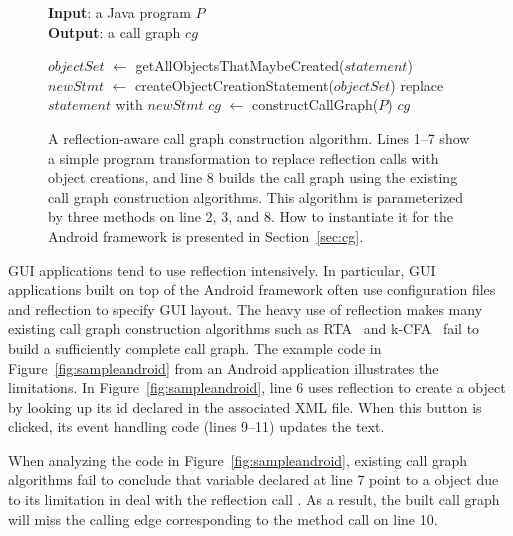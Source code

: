 \begin{figure}[t]
\textbf{Input}: a Java program $\mathit{P}$\\
\textbf{Output}: a call graph $\mathit{cg}$\\
\vspace{-5mm}
\begin{algorithmic}[1]
\STATE $\mathit{objectSet}$ $\leftarrow$ getAllObjectsThatMaybeCreated($\mathit{statement}$)
\STATE $\mathit{newStmt}$ $\leftarrow$ createObjectCreationStatement($\mathit{objectSet}$)
\STATE replace $\mathit{statement}$ with $\mathit{newStmt}$
\ENDIF
\ENDFOR
\STATE $\mathit{cg}$ $\leftarrow$ constructCallGraph($\mathit{P}$)
\RETURN $\mathit{cg}$
\vspace{-2mm}
\end{algorithmic}
\caption{A reflection-aware call graph construction algorithm. Lines
1--7 show a simple program transformation to replace reflection calls
with object creations, and line 8 builds the call graph using
the existing call graph construction algorithms. This algorithm
is parameterized by three methods on line 2, 3, and 8. How to
instantiate it for the Android framework is presented in Section~\ref{sec:cg}.
} 
\label{fig:cgalgorithm}
\end{figure}

GUI applications tend to use reflection intensively. In particular, GUI applications built on 
top of the Android framework often use configuration files and reflection to specify GUI layout.
The heavy use of reflection makes many existing call graph construction algorithms such as RTA~\cite{rta}
and k-CFA~\cite{kcfa} fail to build a sufficiently complete call graph.
The example code in Figure~\ref{fig:sampleandroid} from an Android application
 illustrates the limitations.
In Figure~\ref{fig:sampleandroid}, line 6 uses reflection to create a 
object by looking up its id declared in the associated XML file. When this button
is clicked, its event handling code (lines 9--11) updates the text.

When analyzing the code in Figure~\ref{fig:sampleandroid}, existing call graph algorithms
fail to conclude that variable  declared at line 7
point to a  object due to its limitation in deal with the
reflection call . As a result, the built 
call graph will miss the calling edge corresponding to the
 method call on line 10. 

